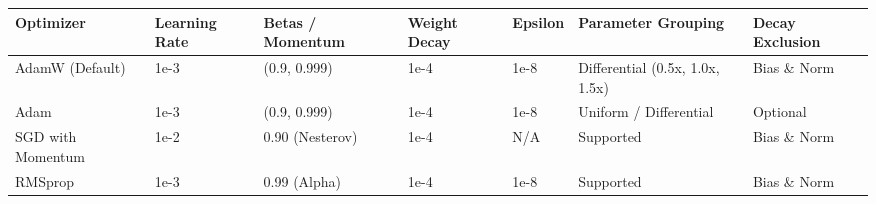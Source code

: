 \begin{tabular}{lllllll}
\toprule
Optimizer & Learning Rate & Betas / Momentum & Weight Decay & Epsilon & Parameter Grouping & Decay Exclusion \\
\midrule
AdamW (Default) & 1e-3 & (0.9, 0.999) & 1e-4 & 1e-8 & Differential (0.5x, 1.0x, 1.5x) & Bias \& Norm \\
Adam & 1e-3 & (0.9, 0.999) & 1e-4 & 1e-8 & Uniform / Differential & Optional \\
SGD with Momentum & 1e-2 & 0.90 (Nesterov) & 1e-4 & N/A & Supported & Bias \& Norm \\
RMSprop & 1e-3 & 0.99 (Alpha) & 1e-4 & 1e-8 & Supported & Bias \& Norm \\
\bottomrule
\end{tabular}

